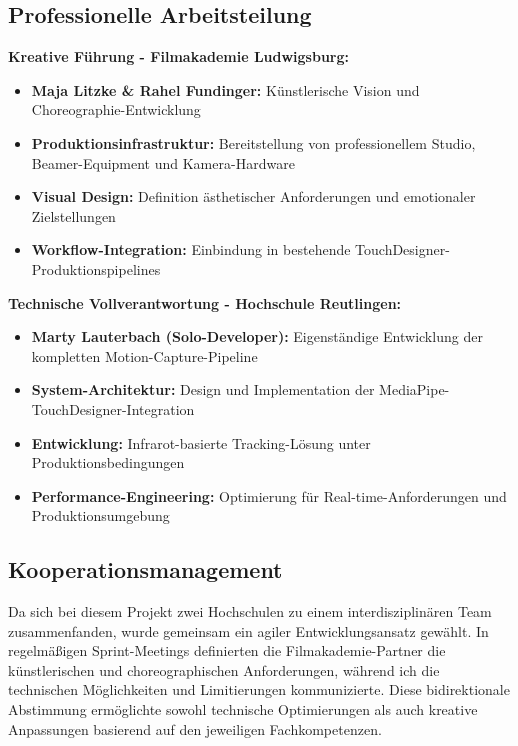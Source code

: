 \newpage

\subsection{Professionelle Arbeitsteilung}

\textbf{Kreative Führung - Filmakademie Ludwigsburg:}
\begin{itemize}
    \item \textbf{Maja Litzke \& Rahel Fundinger:} Künstlerische Vision und Choreographie-Entwicklung
    \item \textbf{Produktionsinfrastruktur:} Bereitstellung von professionellem Studio, Beamer-Equipment und Kamera-Hardware
    \item \textbf{Visual Design:} Definition ästhetischer Anforderungen und emotionaler Zielstellungen
    \item \textbf{Workflow-Integration:} Einbindung in bestehende TouchDesigner-Produktionspipelines
\end{itemize}

\textbf{Technische Vollverantwortung - Hochschule Reutlingen:}
\begin{itemize}
    \item \textbf{Marty Lauterbach (Solo-Developer):} Eigenständige Entwicklung der kompletten Motion-Capture-Pipeline
    \item \textbf{System-Architektur:} Design und Implementation der MediaPipe-TouchDesigner-Integration
    \item \textbf{Entwicklung:} Infrarot-basierte Tracking-Lösung unter Produktionsbedingungen
    \item \textbf{Performance-Engineering:} Optimierung für Real-time-Anforderungen und Produktionsumgebung
\end{itemize}

\subsection{Kooperationsmanagement}

Da sich bei diesem Projekt zwei Hochschulen zu einem interdisziplinären Team zusammenfanden, wurde gemeinsam ein agiler Entwicklungsansatz gewählt. In regelmäßigen Sprint-Meetings definierten die Filmakademie-Partner die künstlerischen und choreographischen Anforderungen, während ich die technischen Möglichkeiten und Limitierungen kommunizierte. Diese bidirektionale Abstimmung ermöglichte sowohl technische Optimierungen als auch kreative Anpassungen basierend auf den jeweiligen Fachkompetenzen.

